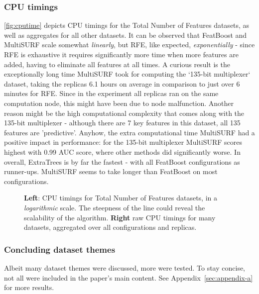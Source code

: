 \documentclass{article}
\begin{document}
\subsubsection{CPU timings}
\autoref{fig:cputime} depicts CPU timings for the Total Number of Features datasets, as well as aggregates for all other datasets. It can be observed that FeatBoost and MultiSURF scale somewhat \textit{linearly}, but RFE, like expected, \textit{exponentially} - since RFE is exhaustive it requires significantly more time when more features are added, having to eliminate all features at all times. A curious result is the exceptionally long time MultiSURF took for computing the `135-bit multiplexer` dataset, taking the replicas 6.1 hours on average in comparison to just over 6 minutes for RFE. Since in the experiment all replicas ran on the same computation node, this might have been due to node malfunction. Another reason might be the high computational complexity that comes along with the 135-bit multiplexer - although there are 7 key features in this dataset, all 135 features are 'predictive'. Anyhow, the extra computational time MultiSURF had a positive impact in performance: for the 135-bit multiplexer MultiSURF scores highest with 0.99 AUC score, where other methods did significantly worse. In overall, ExtraTrees is by far the fastest - with all FeatBoost configurations as runner-ups. MultiSURF seems to take longer than FeatBoost on most configurations.

\begin{figure}[ht]
\centering


\caption{\textbf{Left}: CPU timings for Total Number of Features datasets, in a \textit{logarithmic} scale. The steepness of the line could reveal the scalability of the algorithm. \textbf{Right} raw CPU timings for many datasets, aggregated over all configurations and replicas.}
\label{fig:cputime}
\end{figure}

\subsubsection{Concluding dataset themes}
Albeit many dataset themes were discussed, more were tested. To stay concise, not all were included in the paper's main content. See Appendix~\ref{sec:appendix-a} for more results.
\end{document}
